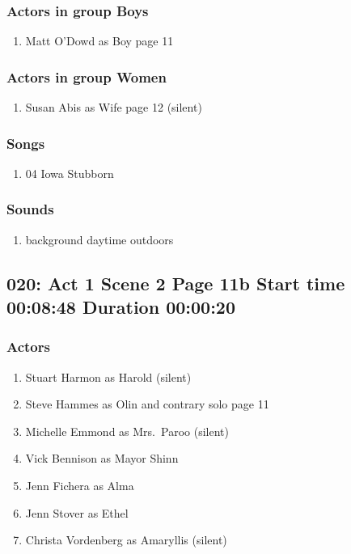 \subsubsection{Actors in group Boys}
\begin{enumerate}
\item Matt O'Dowd as Boy page 11
\end{enumerate}
\subsubsection{Actors in group Women}
\begin{enumerate}
\item Susan Abis as Wife page 12 (silent)
\end{enumerate}

\subsubsection{Songs}
\begin{enumerate}
\item 04 Iowa Stubborn
\end{enumerate}\subsubsection{Sounds}
\begin{enumerate}
\item background daytime outdoors
\end{enumerate}
\subsection{020: Act 1 Scene 2 Page 11b Start time 00:08:48 Duration 00:00:20}

\subsubsection{Actors}
\begin{enumerate}
\item Stuart Harmon as Harold (silent)
\item Steve Hammes as Olin and contrary solo page 11
\item Michelle Emmond as Mrs.~Paroo (silent)
\item Vick Bennison as Mayor Shinn
\item Jenn Fichera as Alma
\item Jenn Stover as Ethel
\item Christa Vordenberg as Amaryllis (silent)
\end{enumerate}
